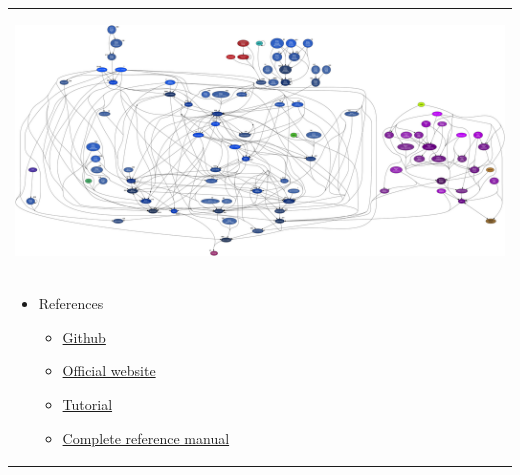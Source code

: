 \documentclass{article}
\begin{document}
\begin{longtable}{|p{\textwidth}|}
\begin{center}
\includegraphics[width=.6\textwidth]{web2py_5}
\end{center} \\

\begin{itemize}
	\item References
	\begin{itemize}
		\item \href{https://github.com/web2py/web2py/}{Github}
		\item \href{http://www.web2py.com/}{Official website}
		\item \href{http://www.web2py.com/books/default/chapter/29/00/preface}{Tutorial}
		\item \href{https://mdipierro.github.io/web2py/web2py_manual_5th.pdf}{Complete reference manual}
	\end{itemize}			
\end{itemize} \\
\hline
\end{longtable}
\end{document}
